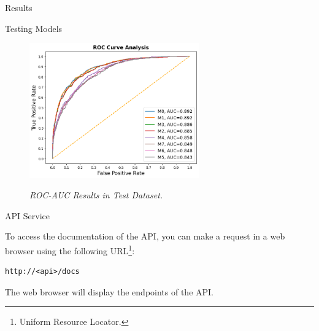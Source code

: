 \documentclass[dvipsnames,mathserif]{beamer}
\begin{document}
{    \begin{frame}
      \begin{center}
        \Huge Results
      \end{center}
    \end{frame}

    \begin{frame}
      \large Testing Models
      \vspace{0.25cm}
      \begin{figure}[H]
        \centering
        \includegraphics[width=0.65\textwidth]{images/rocaucanalysis-all.png}
        \caption[ROC-AUC Results in Test Dataset]{\textit{ROC-AUC Results in Test Dataset. }}
        {\label{fig:rocaucanalysis-all}}
      \end{figure}

    \end{frame}

    \begin{frame}[fragile]

      \large API Service
      \vspace{0.25cm}

      \footnotesize
      To access the documentation of the API, you can make a request in a web
      browser using the following URL\footnote{Uniform Resource Locator.}:

      \vspace{0.1cm}

      \begin{Verbatim}[fontsize=\tiny]
http://<api>/docs
      \end{Verbatim}

      The web browser will display the endpoints of the API.


\end{frame}}
\end{document}
